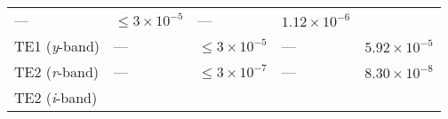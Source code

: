 \documentclass[DM,toc]{lsstdoc}
\begin{document}
\begin{longtable}[]{@{}lllll@{}}
\begin{minipage}[t]{0.05\columnwidth}
---\strut
\end{minipage} & \begin{minipage}[t]{0.24\columnwidth}\raggedright\strut
\(\leq 3\times 10^{-5}\)\strut
\end{minipage} & \begin{minipage}[t]{0.21\columnwidth}\raggedright\strut
---\strut
\end{minipage} & \begin{minipage}[t]{0.22\columnwidth}\raggedright\strut
\(1.12\times 10^{-6}\)\strut
\end{minipage}\tabularnewline
\begin{minipage}[t]{0.13\columnwidth}\raggedright\strut
TE1 (\emph{y}-band)\strut
\end{minipage} & \begin{minipage}[t]{0.05\columnwidth}\raggedright\strut
---\strut
\end{minipage} & \begin{minipage}[t]{0.24\columnwidth}\raggedright\strut
\(\leq 3\times 10^{-5}\)\strut
\end{minipage} & \begin{minipage}[t]{0.21\columnwidth}\raggedright\strut
---\strut
\end{minipage} & \begin{minipage}[t]{0.22\columnwidth}\raggedright\strut
\(5.92\times 10^{-5}\)\strut
\end{minipage}\tabularnewline
\begin{minipage}[t]{0.13\columnwidth}\raggedright\strut
TE2 (\emph{r}-band)\strut
\end{minipage} & \begin{minipage}[t]{0.05\columnwidth}\raggedright\strut
---\strut
\end{minipage} & \begin{minipage}[t]{0.24\columnwidth}\raggedright\strut
\(\leq 3\times 10^{-7}\)\strut
\end{minipage} & \begin{minipage}[t]{0.21\columnwidth}\raggedright\strut
---\strut
\end{minipage} & \begin{minipage}[t]{0.22\columnwidth}\raggedright\strut
\(8.30\times 10^{-8}\)\strut
\end{minipage}\tabularnewline
\begin{minipage}[t]{0.13\columnwidth}\raggedright\strut
TE2 (\emph{i}-band)\strut
\end{minipage} & \begin{minipage}[t]{0.05\columnwidth}\raggedright\strut

\end{minipage}
\end{longtable}
\end{document}
